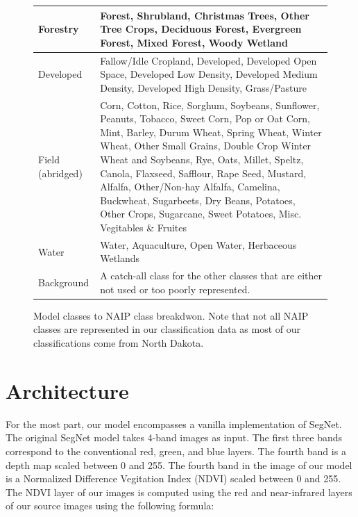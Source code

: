 \documentclass[12pt]{article}
\begin{document}
\begin{figure}
  \begin{tabular}[]{|p{2cm}|p{12cm}|}
  \hline
  Forestry & Forest, Shrubland, Christmas Trees, Other Tree Crops, Deciduous Forest, Evergreen Forest, Mixed Forest, Woody Wetland \\ \hline
  Developed & Fallow/Idle Cropland, Developed, Developed Open Space, Developed Low Density, Developed Medium Density, Developed High Density, Grass/Pasture \\ \hline
  Field (abridged) & Corn, Cotton, Rice, Sorghum, Soybeans, Sunflower, Peanuts, Tobacco, Sweet Corn, Pop or Oat Corn, Mint, Barley, Durum Wheat, Spring Wheat, Winter Wheat, Other Small Grains, Double Crop Winter Wheat and Soybeans, Rye, Oats, Millet, Speltz, Canola, Flaxseed, Safflour, Rape Seed, Mustard, Alfalfa, Other/Non-hay Alfalfa, Camelina, Buckwheat, Sugarbeets, Dry Beans, Potatoes, Other Crops, Sugarcane, Sweet Potatoes, Misc. Vegitables \& Fruites \\ \hline
  Water & Water, Aquaculture, Open Water, Herbaceous Wetlands \\ \hline
  Background & A catch-all class for the other classes that are either not used or too poorly represented. \\ \hline
  \end{tabular}
  \caption{Model classes to NAIP class breakdwon. Note that not all NAIP classes are represented in our classification data as most of our classifications come from North Dakota.}
\end{figure}


\begin{figure}
\end{figure}



\section{Architecture}

For the most part, our model encompasses a vanilla implementation of SegNet. The original SegNet model takes 4-band images as input. The first three bands correspond to the conventional red, green, and blue layers. The fourth band is a depth map scaled between 0 and 255. The fourth band in the image of our model is a Normalized Difference Vegitation Index (NDVI)\cite{NDVI} scaled between 0 and 255. The NDVI layer of our images is computed using the red and near-infrared layers of our source images using the following formula:  
\begin{figure}[!htb]
\end{figure}
\end{document}
